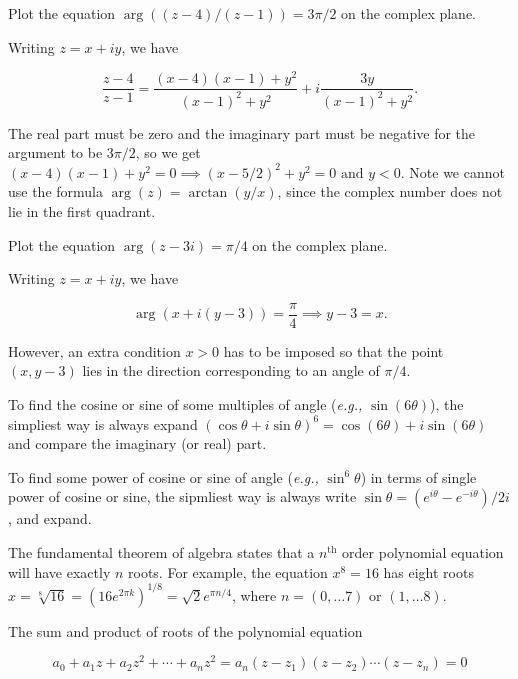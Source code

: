 \documentclass[english,a4paper,12pt]{report}
\begin{document}
{Plot the equation \( \arg \left((z-4)/(z-1)\right)=3\pi /2 \) on the complex plane. }
{Writing \(z = x+iy\), we have 

\begin{equation}
    \frac{z-4}{z-1} = \frac{(x-4)(x-1)+y^2}{(x-1)^2+y^2} + i \frac{3y}{(x-1)^2+y^2}.  
\end{equation}

The real part must be zero and the imaginary part must be negative for the argument to be \(3\pi /2\), so we get \((x-4)(x-1)+y^2=0 \implies (x-5/2)^2+y^2 = 0 \text { and } y<0\). Note we cannot use the formula \(\arg (z) =  \arctan {\left(y /x\right) } \), since the complex number does not lie in the first quadrant.   
} 

{Plot the equation \(\arg (z-3i) = \pi /4\) on the complex plane. }
{Writing \(z = x+iy\), we have

\begin{equation}
    \arg \left( x+i(y-3) \right) =\frac{\pi }{4} \implies y - 3 = x. 
\end{equation}

However, an extra condition \(x > 0\) has to be imposed so that the point \((x,y-3)\) lies in the direction corresponding to an angle of \(\pi /4\).  

} 

To find the cosine or sine of some multiples of angle (\textit{e.g.,} \(\sin (6\theta )\)), the simpliest way is always expand \((\cos \theta +i\sin \theta )^6 = \cos (6\theta ) + i\sin (6\theta )\) and compare the imaginary (or real) part. 

To find some power of cosine or sine of angle (\textit{e.g.,} \(\sin ^{6} \theta \)) in terms of single power of cosine or sine, the sipmliest way is always write \(\sin \theta = (e^{i \theta }-e^{-i \theta })/2i \), and expand. 

The fundamental theorem of algebra states that a \(n^{\text{th}}\) order polynomial equation will have exactly \(n\) roots. For example, the equation \(x^{8} = 16\) has eight roots \(x = \sqrt[8]{16} = (16e^{2\pi k})^{1 /8 } = \sqrt{2}e^{\pi n/4 }\), where \(n = (0,\ldots 7) \text { or } (1,\ldots 8)\).   

The sum and product of roots of the polynomial equation

\begin{equation}
    a_0 + a_1 z + a_2 z ^2 + \cdots + a_{n}z^2 = a_{n}(z - z_1 )(z-z_2 )\cdots (z-z_{n} ) = 0   
\end{equation}
\end{document}
